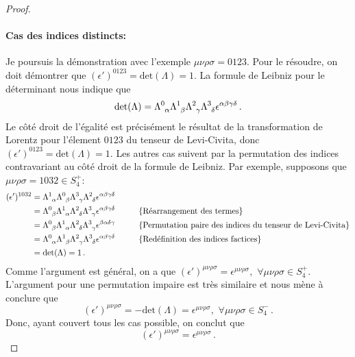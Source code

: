 \documentclass{article}
\numberwithin{equation}{section}
\theoremstyle{solution}
\begin{document}
\begin{proof}
\paragraph{Cas des indices distincts:} 
Je poursuis la démonstration avec l'exemple $\mu\nu\rho\sigma=0123$. Pour le résoudre, on doit démontrer que 
$(\epsilon')^{0123} = \mathrm{det}(\Lambda) = 1$.  La formule de Leibniz pour le déterminant nous indique que
\begin{equation}\label{eq:Leibniz}
        \mathrm{det}(\Lambda) = \Lambda\indices{^{0}_{\alpha}}\Lambda\indices{^{1}_{\beta}}\Lambda\indices{^{2}_{\gamma}}\Lambda\indices{^{3}_{\delta}}\epsilon^{\alpha\beta\gamma\delta}\, .
\end{equation} 
Le côté droit de l'égalité est précisément le résultat de la transformation de Lorentz pour l'élement $0123$ du tenseur de Levi-Civita, 
donc $(\epsilon')^{0123} = \mathrm{det}(\Lambda) = 1$. 
Les autres cas suivent par la permutation des indices contravariant au côté droit de la formule de Leibniz. 
Par exemple, supposons que $\mu\nu\rho\sigma = 1032 \in S_4^{+}$:
\begin{align*}
        (\epsilon')^{1032} &= \Lambda\indices{^{1}_{\alpha}}\Lambda\indices{^{0}_{\beta}}\Lambda\indices{^{3}_{\gamma}}\Lambda\indices{^{2}_{\delta}}\epsilon^{\alpha\beta\gamma\delta}\\
                           &= \Lambda\indices{^{0}_{\beta}}\Lambda\indices{^{1}_{\alpha}}\Lambda\indices{^{2}_{\delta}}\Lambda\indices{^{3}_{\gamma}}\epsilon^{\alpha\beta\gamma\delta}  \hspace{1cm} \{\text{Réarrangement des termes}\} \\
               &= \Lambda\indices{^{0}_{\beta}}\Lambda\indices{^{1}_{\alpha}}\Lambda\indices{^{2}_{\delta}}\Lambda\indices{^{3}_{\gamma}}\epsilon^{\beta\alpha\delta\gamma}  \hspace{1cm} \{\text{Permutation paire des indices du tenseur de Levi-Civita} \} \\
               &= \Lambda\indices{^{0}_{\alpha}}\Lambda\indices{^{1}_{\beta}}\Lambda\indices{^{2}_{\gamma}}\Lambda\indices{^{3}_{\delta}}\epsilon^{\alpha\beta\gamma\delta}  \hspace{1cm} \{\text{Redéfinition des indices factices} \} \\
               &= \mathrm{det}(\Lambda) = 1\, .\\ 
\end{align*} 
Comme l'argument est général, on a que $(\epsilon')^{\mu\nu\rho\sigma} = \epsilon^{\mu\nu\rho\sigma},\,\, \forall \mu\nu\rho\sigma \in S_4^{+}$.
L'argument pour une permutation impaire est très similaire et nous mène à conclure que 
\begin{equation}
(\epsilon')^{\mu\nu\rho\sigma} = -\mathrm{det}(\Lambda) = \epsilon^{\mu\nu\rho\sigma}, \,\, \forall \mu\nu\rho\sigma \in S_4^{-}\, .
\end{equation} 
Donc, ayant couvert tous les cas possible, on conclut que
\begin{equation}
        (\epsilon')^{\mu\nu\rho\sigma} = \epsilon^{\mu\nu\rho\sigma}\, .
\end{equation} 
\end{proof}
        
\end{document}
